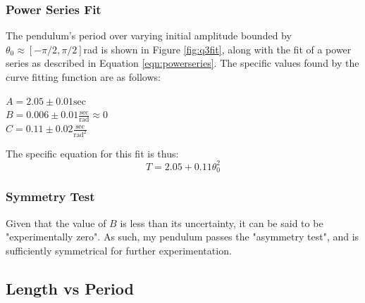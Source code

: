 \documentclass[12pt]{article}
\begin{document}
\subsubsection{Power Series Fit}
\label{section:q3fit}

The pendulum's period over varying initial amplitude bounded by $\theta_0 \approx [-\pi/2,\pi/2]$rad is shown in Figure \ref{fig:q3fit}, along with the fit of a power series as described in Equation \ref{eqn:powerseries}.
The specific values found by the curve fitting function are as follows:
\begin{center}
    $
    A= 2.05 \pm 0.01\text{sec}
    $\\
    $
    B= 0.006 \pm 0.01 \frac {\text{sec}}{\text{rad}}\approx 0$\\
    $
    C= 0.11 \pm 0.02\frac {\text{sec}}{\text{rad}^2}
    $
\end{center}
The specific equation for this fit is thus:
\begin{equation}
    T = 2.05 + 0.11\theta_0^2
\end{equation}

\subsubsection{Symmetry Test}

Given that the value of $B$ is less than its uncertainty, it can be said to be "experimentally zero". 
As such, my pendulum passes the "asymmetry test", and is sufficiently symmetrical for further experimentation.\medskip\\

\pagebreak

\subsection{Length vs Period}
\label{section:q4a}
\end{document}
